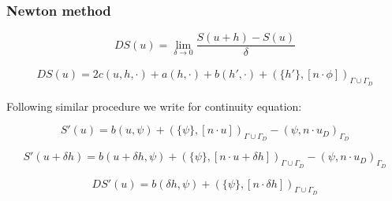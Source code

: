 \documentclass{beamer}
\begin{document}
\begin{frame}
\frametitle{Newton method}

\begin{flushleft}
\begin{equation}
DS(u) = \lim_{\delta \to 0} \frac{S(u+h)-S(u)}{\delta}
\end{equation}
\end{flushleft}

\begin{flushleft}
\begin{equation}
\begin{split}
DS(u) = 2 c(u,h,\cdot) + a(h,\cdot) + b(h',\cdot) + (\{h'\},[n\cdot \phi])_{\Gamma \cup \Gamma_D}
\end{split}
\end{equation}
\end{flushleft}

Following similar procedure we write for continuity equation:\\
\begin{flushleft}
\begin{equation}
S'(u) = b(u,\psi) + (\{\psi\},[n \cdot u])_{\Gamma \cup \Gamma_D} - (\psi,n \cdot u_D)_{\Gamma_D}
\end{equation}
\end{flushleft}

\begin{flushleft}
\begin{equation}
S'(u+\delta h) = b(u + \delta h,\psi) + (\{\psi\},[n \cdot u + \delta h])_{\Gamma \cup \Gamma_D} - (\psi,n \cdot u_D)_{\Gamma_D}
\end{equation}
\end{flushleft}

\begin{flushleft}
\begin{equation}
DS'(u) = b(\delta h,\psi) + (\{\psi\},[n \cdot \delta h])_{\Gamma \cup \Gamma_D} 
\end{equation}
\end{flushleft}

\end{frame}

\end{document}
